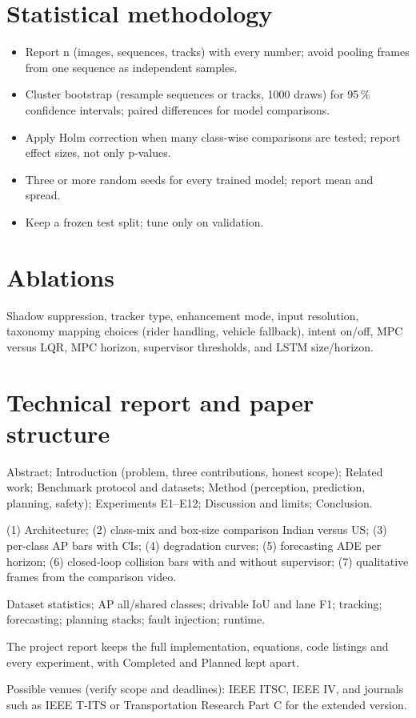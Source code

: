 \documentclass[11pt,a4paper]{article}
\begin{document}
\section{Statistical methodology}
\begin{itemize}
\item Report n (images, sequences, tracks) with every number; avoid pooling frames from one sequence as independent samples.
\item Cluster bootstrap (resample sequences or tracks, 1000 draws) for 95\,\% confidence intervals; paired differences for model comparisons.
\item Apply Holm correction when many class-wise comparisons are tested; report effect sizes, not only p-values.
\item Three or more random seeds for every trained model; report mean and spread.
\item Keep a frozen test split; tune only on validation.
\end{itemize}

\section{Ablations}
Shadow suppression, tracker type, enhancement mode, input resolution, taxonomy mapping choices (rider handling, vehicle fallback), intent on/off, MPC versus LQR, MPC horizon,
supervisor thresholds, and LSTM size/horizon.

\section{Technical report and paper structure}
\begin{description}[leftmargin=1.5em]
\item[Paper (8 pages, two columns).] Abstract; Introduction (problem, three contributions, honest scope); Related work; Benchmark protocol and datasets; Method (perception, prediction, planning, safety); Experiments E1--E12; Discussion and limits; Conclusion.
\item[Figures.] (1) Architecture; (2) class-mix and box-size comparison Indian versus US; (3) per-class AP bars with CIs; (4) degradation curves; (5) forecasting ADE per horizon; (6) closed-loop collision bars with and without supervisor; (7) qualitative frames from the comparison video.
\item[Tables.] Dataset statistics; AP all/shared classes; drivable IoU and lane F1; tracking; forecasting; planning stacks; fault injection; runtime.
\item[Technical report.] The project report keeps the full implementation, equations, code listings and every experiment, with Completed and Planned kept apart.
\end{description}
Possible venues (verify scope and deadlines): IEEE ITSC, IEEE IV, and journals such as IEEE T-ITS or Transportation Research Part C for the extended version.
\end{document}
